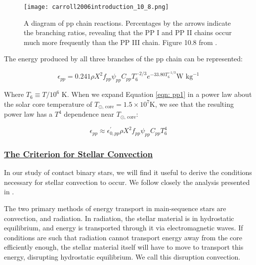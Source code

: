 \documentclass[12pt]{article} %
\numberwithin{equation}{section} %
\begin{document}
\begin{figure}[H]
\centering
\texttt{[image: carroll2006introduction\_10\_8.png]}
\caption{A diagram of pp chain reactions. Percentages by the arrows indicate the branching ratios, revealing that the PP I and PP II chains occur much more frequently than the PP III chain. Figure 10.8 from \citet{carroll2006introduction}.}
\label{fig: carroll2006introduction_10_8}
\end{figure}

The energy produced by all three branches of the pp chain can be represented:

\begin{equation} \label{eqn: pp1}
\epsilon_{pp} = 0.241 \rho X^{2} f_{pp} \psi_{pp} C_{pp} T_{6}^{-2/3} e^{-33.80 T_{6}^{-1/3}} \text{W } \text{kg}^{-1}
\end{equation}

Where $T_{6} \equiv T / 10^{6}$ K. When we expand Equation \ref{eqn: pp1} in a power law about the solar core temperature of $T_{\odot \text{, core}} = 1.5 \times 10^{7}$K, we see that the resulting power law has a $T^{4}$ dependence near $T_{\odot \text{, core}}$:

\begin{equation} \label{eqn: pp2}
\epsilon_{pp} \approx \epsilon_{0, pp}^{'} \rho X^{2} f_{pp} \psi_{pp} C_{pp} T_{6}^{4}
\end{equation}

\subsubsection[The Criterion for Stellar Convection]{\hyperlink{toc}{The Criterion for Stellar Convection}} \label{sec: The Criterion for Stellar Convection}

In our study of contact binary stars, we will find it useful to derive the conditions necessary for stellar convection to occur. We follow closely the analysis presented in \citet{carroll2006introduction}.

The two primary methods of energy transport in main-sequence stars are convection, and radiation. In radiation, the stellar material is in hydrostatic equilibrium, and energy is transported through it via electromagnetic waves. If conditions are such that radiation cannot transport energy away from the core efficiently enough, the stellar material itself will have to move to transport this energy, disrupting hydrostatic equilibrium. We call this disruption convection. 
\end{document}
